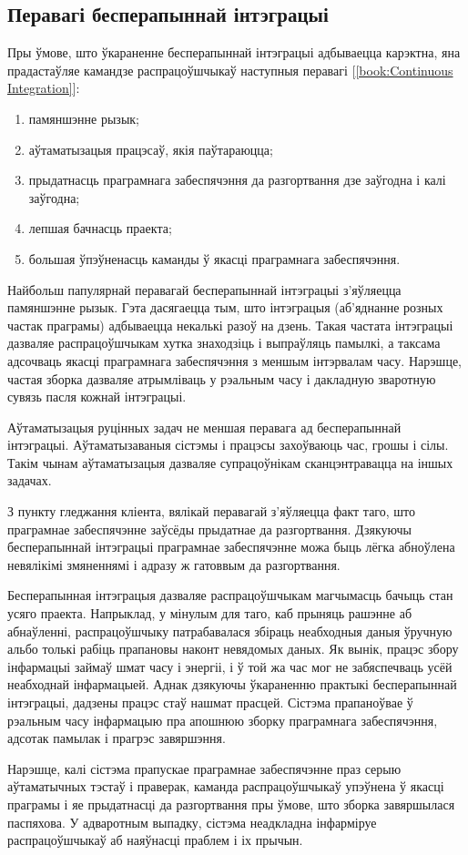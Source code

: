 \subsection{Перавагі бесперапыннай інтэграцыі}

Пры ўмове, што ўкараненне бесперапыннай інтэграцыі адбываецца карэктна,
яна прадастаўляе камандзе распрацоўшчыкаў наступныя перавагі%
[\ref{book:Continuous Integration}]:

\begin{enumerate}
    \item памяншэнне рызык;
    \item аўтаматызацыя працэсаў, якія паўтараюцца;
    \item прыдатнасць праграмнага забеспячэння да разгортвання
          дзе заўгодна і калі заўгодна;
    \item лепшая бачнасць праекта;
    \item большая ўпэўненасць каманды ў якасці праграмнага забеспячэння.
\end{enumerate}

Найбольш папулярнай перавагай бесперапыннай інтэграцыі з'яўляецца
памяншэнне рызык. Гэта дасягаецца тым, што інтэграцыя (аб'яднанне
розных частак праграмы) адбываецца некалькі разоў на дзень.
Такая частата інтэграцыі дазваляе распрацоўшчыкам хутка знаходзіць
і выпраўляць памылкі, а таксама адсочваць якасці праграмнага забеспячэння
з меншым інтэрвалам часу. Нарэшце, частая зборка дазваляе атрымліваць
у рэальным часу і дакладную зва\-рот\-ную сувязь пасля кожнай інтэграцыі.

Аўтаматызацыя руцінных задач не меншая перавага ад бесперапыннай
інтэграцыі. Аўтаматызаваныя сістэмы і працэсы захоўваюць час, грошы
і сілы. Такім чынам аўтаматызацыя дазваляе супрацоўнікам сканцэнтравацца
на іншых задачах.

З пункту гледжання кліента, вялікай перавагай з'яўляецца факт таго,
што праграмнае забеспячэнне заўсёды прыдатнае да разгортвання.
Дзякуючы бесперапыннай інтэграцыі праграмнае забеспячэнне можа
быць лёгка абноўлена невялікімі змяненнямі і адразу ж гатоввым да
разгортвання.

Бесперапынная інтэграцыя дазваляе распрацоўшчыкам магчымасць бачыць
стан усяго праекта. Напрыклад, у мінулым для таго, каб прыняць
рашэнне аб абнаўленні, распрацоўшчыку патрабавалася збіраць неабходныя
даныя ўручную альбо толькі рабіць прапановы наконт невядомых даных.
Як вынік, працэс збору інфармацыі займаў шмат часу і энергіі,
і ў той жа час мог не забяспечваць усёй неабходнай інфармацыей.
Аднак дзякуючы ўкараненню практыкі бесперапыннай інтэграцыі,
дадзены працэс стаў нашмат прасцей.
Сістэма прапаноўвае ў рэальным часу інфармацыю пра апошнюю зборку
праграмнага забеспячэння, адсотак памылак і прагрэс завяршэння.

Нарэшце, калі сістэма прапускае праграмнае забеспячэнне
праз серыю аўтаматычных тэстаў і праверак, каманда распрацоўшчыкаў
упэўнена ў якасці праграмы і яе прыдатнасці да разгортвання
пры ўмове, што зборка завяршылася паспяхова.
У адваротным выпадку, сістэма неадкладна інфарміруе распрацоўшчыкаў
аб наяўнасці праблем і іх прычын.
